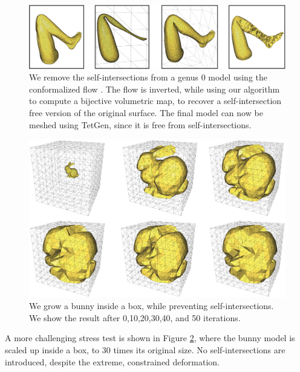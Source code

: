 \begin{figure}[t]
\includegraphics[width=\columnwidth]{scaf-tex/figs/leg-flow}
\caption{We remove the self-intersections from a genus 0 model using the conformalized flow \protect\cite{Kazhdan:2012,Sacht:2013}. The flow is inverted, while using our algorithm to compute a bijective volumetric map, to recover a self-intersection free version of the original surface. The final model can now be meshed using TetGen, since it is free from self-intersections.}
\vspace{-0.2cm}
\label{scaf:fig:flow}
\end{figure}

\begin{figure}[t]
\centering
\includegraphics[width=0.8\columnwidth]{scaf-tex/figs/rabbit_grow}
\caption{We grow a bunny inside a box, while preventing  self-intersections. We show the result after 0,10,20,30,40, and 50 iterations.}
\label{scaf:fig:rabbit}
\end{figure}


A more challenging stress test is shown in Figure \ref{scaf:fig:rabbit}, where the bunny model is scaled up inside a box, to 30 times its original size. No self-intersections are introduced, despite the extreme, constrained deformation.

